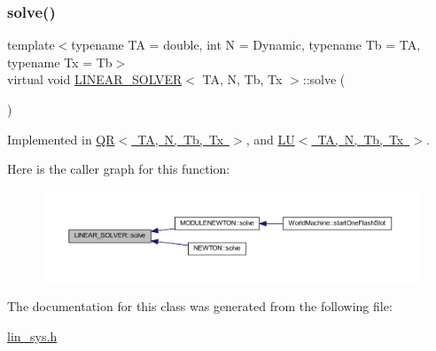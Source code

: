 \subsubsection{\texorpdfstring{solve()}{solve()}}
{\footnotesize\ttfamily template$<$typename TA = double, int N = Dynamic, typename Tb = TA, typename Tx = Tb$>$ \\
virtual void \mbox{\hyperlink{class_l_i_n_e_a_r___s_o_l_v_e_r}{L\+I\+N\+E\+A\+R\+\_\+\+S\+O\+L\+V\+ER}}$<$ TA, N, Tb, Tx $>$\+::solve (\begin{DoxyParamCaption}\item[{\mbox{\hyperlink{class_l_i_n_e_a_r___s_y_s_t_e_m}{L\+I\+N\+E\+A\+R\+\_\+\+S\+Y\+S\+T\+EM}}$<$ TA, N, Tb, Tx $>$ \&}]{ }\end{DoxyParamCaption})\hspace{0.3cm}{\ttfamily [pure virtual]}}



Implemented in \mbox{\hyperlink{class_q_r_ab8f49cec36214bdcd9fca78e89c3737e}{Q\+R$<$ T\+A, N, Tb, Tx $>$}}, and \mbox{\hyperlink{class_l_u_a624d7ff38645debae206313534516f49}{L\+U$<$ T\+A, N, Tb, Tx $>$}}.

Here is the caller graph for this function\+:\nopagebreak
\begin{figure}[H]
\begin{center}
\leavevmode
\includegraphics[width=350pt]{class_l_i_n_e_a_r___s_o_l_v_e_r_a83c4d3b280e57814ec091dd9f8927c24_icgraph}
\end{center}
\end{figure}


The documentation for this class was generated from the following file\+:\begin{DoxyCompactItemize}
\item 
\mbox{\hyperlink{lin__sys_8h}{lin\+\_\+sys.\+h}}\end{DoxyCompactItemize}
